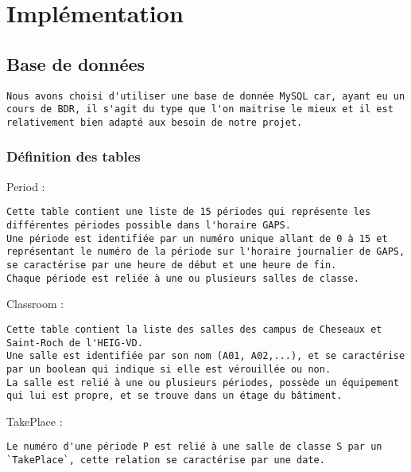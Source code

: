 \documentclass[12pt]{article}
\begin{document}
\hypertarget{header-n0}{%
\section{Implémentation}\label{header-n0}}

\hypertarget{header-n2}{%
\subsection{Base de données}\label{header-n2}}

\begin{verbatim}
Nous avons choisi d'utiliser une base de donnée MySQL car, ayant eu un cours de BDR, il s'agit du type que l'on maitrise le mieux et il est relativement bien adapté aux besoin de notre projet.
\end{verbatim}

\hypertarget{header-n5}{%
\subsubsection{Définition des tables}\label{header-n5}}

Period :

\begin{verbatim}
Cette table contient une liste de 15 périodes qui représente les différentes périodes possible dans l'horaire GAPS.
Une période est identifiée par un numéro unique allant de 0 à 15 et représentant le numéro de la période sur l'horaire journalier de GAPS, se caractérise par une heure de début et une heure de fin.
Chaque période est reliée à une ou plusieurs salles de classe.
\end{verbatim}

Classroom :

\begin{verbatim}
Cette table contient la liste des salles des campus de Cheseaux et Saint-Roch de l'HEIG-VD.
Une salle est identifiée par son nom (A01, A02,...), et se caractérise par un boolean qui indique si elle est vérouillée ou non.
La salle est relié à une ou plusieurs périodes, possède un équipement qui lui est propre, et se trouve dans un étage du bâtiment.
\end{verbatim}

TakePlace :

\begin{verbatim}
Le numéro d'une période P est relié à une salle de classe S par un `TakePlace`, cette relation se caractérise par une date.
\end{verbatim}
\end{document}
